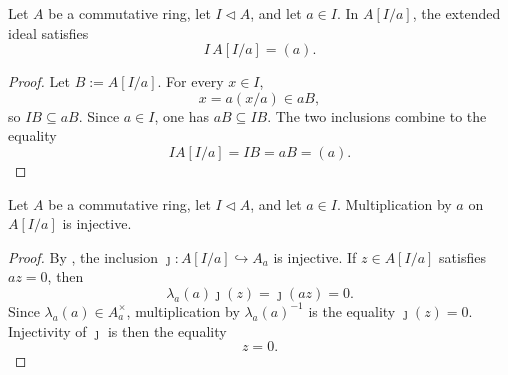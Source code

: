 \begin{lemma}
  \label{lemma:nagata-chart-extended-ideal-principal}
  \lean{}

  Let $A$ be a commutative ring, let $I\triangleleft A$, and let $a\in I$.
  In $A[I/a]$, the extended ideal satisfies
  \[
    I\,A[I/a]=(a).
  \]
\end{lemma}

\begin{proof}
  Let $B:=A[I/a]$.  For every $x\in I$,
  \[
    x=a(x/a)\in aB,
  \]
  so $IB\subseteq aB$.  Since $a\in I$, one has $aB\subseteq IB$.
  The two inclusions combine to the equality
  \[
    IA[I/a]=IB=aB=(a).
  \]
\end{proof}

\begin{lemma}
  \label{lemma:nagata-chart-generator-regular}
  \lean{}

  Let $A$ be a commutative ring, let $I\triangleleft A$, and let $a\in I$.
  Multiplication by $a$ on $A[I/a]$ is injective.
\end{lemma}

\begin{proof}
  By , the inclusion
  $\jmath\colon A[I/a]\hookrightarrow A_a$ is injective.  If
  $z\in A[I/a]$ satisfies $az=0$, then
  \[
    \lambda_a(a)\jmath(z)=\jmath(az)=0.
  \]
  Since $\lambda_a(a)\in A_a^\times$, multiplication by
  $\lambda_a(a)^{-1}$ is the equality $\jmath(z)=0$.  Injectivity of
  $\jmath$ is then the equality
  \[
    z=0.
  \]
\end{proof}

